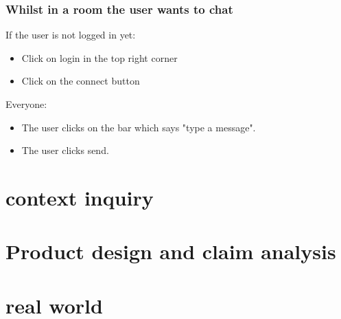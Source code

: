 \subsubsection{Whilst in a room the user wants to chat}
If the user is not logged in yet:
\begin{itemize}
\item Click on login in the top right corner
\item Click on the connect button %
\end{itemize}
Everyone:
\begin{itemize}
\item The user clicks on the bar which says "type a message".
\item The user clicks send.
\end{itemize}



\section{context inquiry}

\section{Product design and claim analysis}



\section{real world}